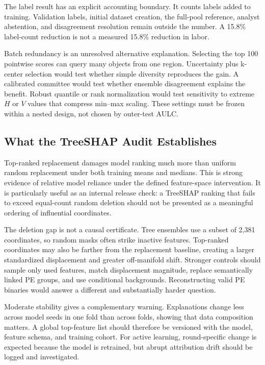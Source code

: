 The label result has an explicit accounting boundary. It counts labels added to
training. Validation labels, initial dataset creation, the full-pool reference,
analyst abstention, and disagreement resolution remain outside the number. A
15.8\% label-count reduction is not a measured 15.8\% reduction in labor.

Batch redundancy is an unresolved alternative explanation. Selecting the top
100 pointwise scores can query many objects from one region. Uncertainty plus
k-center selection would test whether simple diversity reproduces the gain. A
calibrated committee would test whether ensemble disagreement explains the
benefit. Robust quantile or rank normalization would test sensitivity to extreme
$H$ or $V$ values that compress min--max scaling. These settings must be frozen
within a nested design, not chosen by outer-test AULC.

\subsection{What the TreeSHAP Audit Establishes}

Top-ranked replacement damages model ranking much more than uniform random
replacement under both training means and medians. This is strong evidence of
relative model reliance under the defined feature-space intervention. It is
particularly useful as an internal release check: a TreeSHAP ranking that fails
to exceed equal-count random deletion should not be presented as a meaningful
ordering of influential coordinates.

The deletion gap is not a causal certificate. Tree ensembles use a subset of
2,381 coordinates, so random masks often strike inactive features. Top-ranked
coordinates may also be farther from the replacement baseline, creating a larger
standardized displacement and greater off-manifold shift. Stronger controls
should sample only used features, match displacement magnitude, replace
semantically linked PE groups, and use conditional backgrounds. Reconstructing
valid PE binaries would answer a different and substantially harder question.

Moderate stability gives a complementary warning. Explanations change less
across model seeds in one fold than across folds, showing that data composition
matters. A global top-feature list should therefore be versioned with the model,
feature schema, and training cohort. For active learning, round-specific change
is expected because the model is retrained, but abrupt attribution drift should
be logged and investigated.

